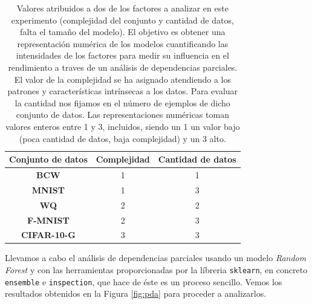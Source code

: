 \begin{table}[H]
\centering
\begin{tabular}{|c|c|c|}
\hline
\textbf{Conjunto de datos} & \textbf{Complejidad} & \textbf{Cantidad de datos} \\ \hline
\textbf{BCW}               & 1               & 1                       \\ \hline
\textbf{MNIST}             & 1                & 3                      \\ \hline
\textbf{WQ}      & 2                & 2                 \\ \hline
\textbf{F-MNIST}           & 2                & 3                      \\ \hline
\textbf{CIFAR-10-G}             & 3           & 3                      \\ \hline
\end{tabular}
\caption[Valores analíticos asignados a los conjuntos de datos para el segundo experimento]{Valores atribuidos a dos de los factores a analizar en este experimento (complejidad del conjunto y cantidad de datos, falta el tamaño del modelo). El objetivo es obtener una representación numérica de los modelos cuantificando las intensidades de los factores para medir su influencia en el rendimiento a traves de un análisis de dependencias parciales. El valor de la complejidad se ha asignado atendiendo a los patrones y características intrínsecas a los datos. Para evaluar la cantidad nos fijamos en el número de ejemplos de dicho conjunto de datos. Las representaciones numéricas toman valores enteros entre 1 y 3, incluidos, siendo un 1 un valor bajo (poca cantidad de datos, baja complejidad) y un 3 alto.}
\label{tab:expP1}
\end{table}





Llevamos a cabo el análisis de dependencias parciales usando un modelo \textit{Random Forest} y con las herramientas proporcionadas por la líbreria \verb|sklearn|, en concreto \verb|ensemble| e \verb|inspection|, que hace de éste es un proceso sencillo. Vemos los resultados obtenidos en la Figura \ref{fig:pda} para proceder a analizarlos. 


